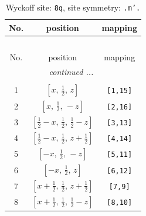 \documentclass[fleqn,8pt]{jsarticle}
\begin{document}
\begin{longtable}{ccc}
\caption{Wyckoff site: {\tt 8q}, site symmetry: {\tt .m'.}}
 \\
 \hline \hline
No. & position & mapping \\ \hline \endfirsthead

\multicolumn{2}{l}{\tablename\ \thetable{}} \\
 \hline \hline
No. & position & mapping \\ \hline \endhead

 \hline \hline
\multicolumn{2}{r}{\footnotesize\it continued ...} \\ \endfoot

 \hline \hline
\multicolumn{2}{r}{} \\ \endlastfoot

1 & $\left[ x,\, \frac{1}{2},\, z \right]$ & {\tt [1,15]} \\ \hline
2 & $\left[ x,\, \frac{1}{2},\, - z \right]$ & {\tt [2,16]} \\ \hline
3 & $\left[ \frac{1}{2} - x,\, \frac{1}{2},\, \frac{1}{2} - z \right]$ & {\tt [3,13]} \\ \hline
4 & $\left[ \frac{1}{2} - x,\, \frac{1}{2},\, z + \frac{1}{2} \right]$ & {\tt [4,14]} \\ \hline
5 & $\left[ - x,\, \frac{1}{2},\, - z \right]$ & {\tt [5,11]} \\ \hline
6 & $\left[ - x,\, \frac{1}{2},\, z \right]$ & {\tt [6,12]} \\ \hline
7 & $\left[ x + \frac{1}{2},\, \frac{1}{2},\, z + \frac{1}{2} \right]$ & {\tt [7,9]} \\ \hline
8 & $\left[ x + \frac{1}{2},\, \frac{1}{2},\, \frac{1}{2} - z \right]$ & {\tt [8,10]} \\
\end{longtable}
\renewcommand{\arraystretch}{1.2}
\end{document}
